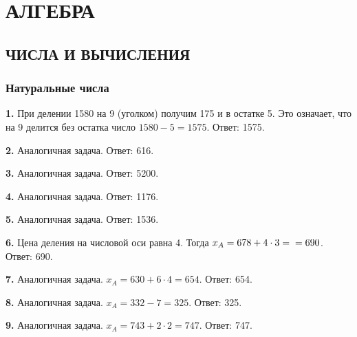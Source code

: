 \chapter{АЛГЕБРА}
\section{ЧИСЛА И ВЫЧИСЛЕНИЯ}
\subsection{Натуральные числа}


\textbf{1.} При делении 1580 на 9 (уголком) получим 175 и в остатке 5. Это означает, что на 9 делится без остатка число $1580-5=1575.$   
\newline \null \hspace*{\fill} Ответ: 1575.

\textbf{2.} Аналогичная задача. \newline \null \hspace*{\fill} Ответ: 616.

\textbf{3.} Аналогичная задача. \newline \null \hspace*{\fill} Ответ: 5200.

\textbf{4.} Аналогичная задача. \newline \null \hspace*{\fill} Ответ: 1176.

\textbf{5.} Аналогичная задача. \newline \null \hspace*{\fill} Ответ: 1536.

\textbf{6.} Цена деления на числовой оси равна 4. Тогда $x_A=678+4\cdot3=\newline=690$. \newline \null \hspace*{\fill} Ответ: 690. 

\textbf{7.} Аналогичная задача. $x_A=630+6\cdot4=654$. \newline \null \hspace*{\fill} Ответ: 654. 

\textbf{8.} Аналогичная задача. $x_A=332-7=325$. \newline \null \hspace*{\fill} Ответ: 325. 

\textbf{9.} Аналогичная задача. $x_A=743+2\cdot2=747$. \newline \null \hspace*{\fill} Ответ: 747. 

